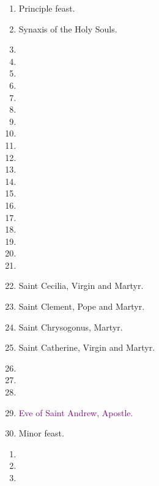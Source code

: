 		\begin{enumerate}
			\item {} Principle feast.
			\item Synaxis of the Holy Souls. 
			\item %
			\item %
			\item %
			\item %
			\item %
			\item %
			\item %
			\item %
			\item %
			\item %
			\item %
			\item %
			\item %
			\item %
			\item %
			\item %
			\item %
			\item %
			\item %
			\item Saint Cecilia, Virgin and Martyr. 
			\item Saint Clement, Pope and Martyr. 
			\item Saint Chrysogonus, Martyr. 
			\item Saint Catherine, Virgin and Martyr. 
			\item %
			\item %
			\item %
			\item \textcolor{purple}{Eve of Saint Andrew, Apostle.}
			\item {} Minor feast.
		\end{enumerate}
	
	\pagebreak[1]
	
	
		\begin{enumerate}
			\item %
			\item %
			\item %
		\end{enumerate}